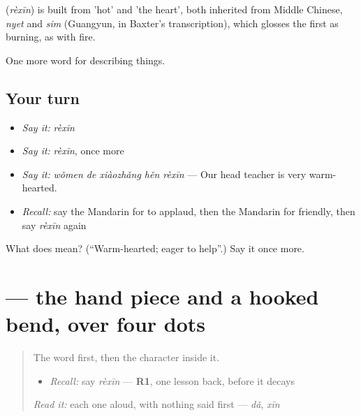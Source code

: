 \begin{cousinweb}
\textbf{} (\emph{rèxīn}) is built from  'hot' and  'the heart', both inherited from Middle Chinese, \emph{nyet} and \emph{sim} (Guangyun, in Baxter's transcription), which glosses the first as burning, as with fire.
\end{cousinweb}

\begin{grammarlens}[title={What you've built}]
One more word for describing things.
\end{grammarlens}

\subsection*{Your turn}
\begin{itemize}
\raggedright
  \item \emph{Say it:} \emph{rèxīn}
  \item \emph{Say it:} \emph{rèxīn}, once more
  \item \emph{Say it:} \emph{wǒmen de xiàozhǎng hěn rèxīn} — Our head teacher is very warm-hearted.
  \item \emph{Recall:} say the Mandarin for to applaud, then the Mandarin for friendly, then say \emph{rèxīn} again
\end{itemize}

\begin{tcolorbox}[breakable,colback=teal!4,colframe=teal!35!black,title={Before you move on}]
What does  mean? (\textquotedblleft{}Warm-hearted; eager to help\textquotedblright{}.) Say it once more.
\end{tcolorbox}
\section[\texorpdfstring{\zh{热} (rè)}{热 (rè)}]{ — the hand piece and a hooked bend, over four dots}

\label{lesson:ZH-W258-re-hot}



\begin{quote}
The word first, then the character inside it.

\begin{itemize}
\raggedright
  \item \emph{Recall:} say \emph{rèxīn} — \textbf{R1}, one lesson back, before it decays
\end{itemize}

\begin{quote}
 
\end{quote}

\emph{Read it:} each one aloud, with nothing said first — \emph{dǎ}, \emph{xīn}
\end{quote}

